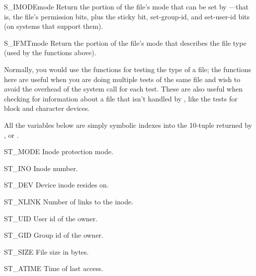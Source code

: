 \begin{funcdesc}{S_IMODE}{mode}
Return the portion of the file's mode that can be set by
---that is, the file's permission bits, plus the
sticky bit, set-group-id, and set-user-id bits (on systems that support
them).
\end{funcdesc}

\begin{funcdesc}{S_IFMT}{mode}
Return the portion of the file's mode that describes the file type (used
by the  functions above).
\end{funcdesc}

Normally, you would use the  functions for
testing the type of a file; the functions here are useful when you are
doing multiple tests of the same file and wish to avoid the overhead of
the  system call for each test.  These are also
useful when checking for information about a file that isn't handled
by , like the tests for block and character
devices.

All the variables below are simply symbolic indexes into the 10-tuple
returned by ,  or
.

\begin{datadesc}{ST_MODE}
Inode protection mode.
\end{datadesc}

\begin{datadesc}{ST_INO}
Inode number.
\end{datadesc}

\begin{datadesc}{ST_DEV}
Device inode resides on.
\end{datadesc}

\begin{datadesc}{ST_NLINK}
Number of links to the inode.
\end{datadesc}

\begin{datadesc}{ST_UID}
User id of the owner.
\end{datadesc}

\begin{datadesc}{ST_GID}
Group id of the owner.
\end{datadesc}

\begin{datadesc}{ST_SIZE}
File size in bytes.
\end{datadesc}

\begin{datadesc}{ST_ATIME}
Time of last access.
\end{datadesc}

